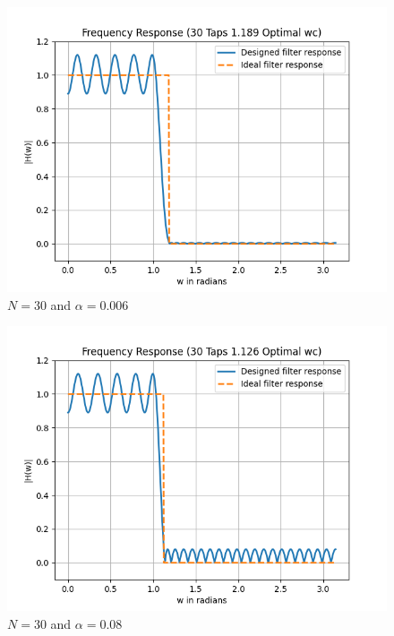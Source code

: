 \documentclass[conference]{IEEEtran}
\begin{document}
\begin{enumerate}[label=(\alph*)]
\begin{figure}[!h]
	\begin{center} 
	    \includegraphics[width=0.7\columnwidth]{figs/B/N30_a1}
	\end{center}
\caption{$N=30$ and $\alpha = 0.006$}
\label{fig:Fig8}
\end{figure}

\begin{figure}[!h]
	\begin{center} 
	    \includegraphics[width=0.7\columnwidth]{figs/B/N30_a2}
	\end{center}
\caption{$N=30$ and $\alpha = 0.08$}
\label{fig:Fig9}
\end{figure}


\end{enumerate}
\end{document}
